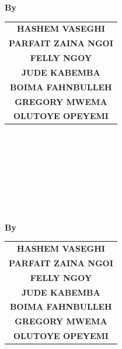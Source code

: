 \documentclass[main]{subfiles}
\begin{document}
\centering
\logo \\[3em]
\textbf{\LARGE \universityname} \\[1em]
\textbf{\Large \facultyname} \\[1em]
\textbf{\large \departmentname} \\[3em]
\textbf{\Huge \projecttitle} \\[2em]
\textbf{\Large By} \\[1em]
\begin{tabular}[pos]{c} 
    \textbf{\uppercase{hashem vaseghi}}      \\[0.5em] 
    \textbf{\uppercase{Parfait Zaina Ngoi}}  \\[0.5em]
    \textbf{\uppercase{Felly Ngoy}}          \\[0.5em]
    \textbf{\uppercase{Jude Kabemba}}        \\[0.5em]
    \textbf{\uppercase{Boima Fahnbulleh}}   \\[0.5em]
    \textbf{\uppercase{Gregory Mwema}}     \\[0.5em]
    \textbf{\uppercase{Olutoye Opeyemi}}   \\[0.5em]
\end{tabular}
\vfill
\textbf{\reportdate} \\[1em]
\textbf{\reportplace} \\[1em]

\newpage

\centering
\logo \\[3em]
\textbf{\LARGE \universityname} \\[1em]
\textbf{\Large \facultyname} \\[1em]
\textbf{\large \departmentname} \\[3em]
\textbf{\Huge \projecttitle} \\[2em]
\textbf{\Large By} \\[1em]
\begin{tabular}[pos]{c} 
    \textbf{\uppercase{hashem vaseghi}}      \\[0.5em]
    \textbf{\uppercase{Parfait Zaina Ngoi}}  \\ [0.5em]
    \textbf{\uppercase{Felly Ngoy}}          \\ [0.5em] 
    \textbf{\uppercase{Jude Kabemba}}        \\ [0.5em]
    \textbf{\uppercase{Boima Fahnbulleh}}   \\[0.5em]
    \textbf{\uppercase{Gregory Mwema}}     \\[0.5em]
    \textbf{\uppercase{Olutoye Opeyemi}}   \\[0.5em]
\end{tabular}
\vfill
\textbf{\reportdate} \\[1em]
\textbf{\reportplace} \\[1em]
\end{document}
